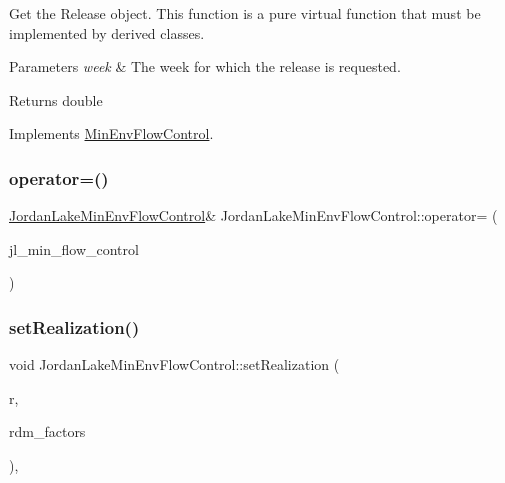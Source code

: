 Get the Release object. This function is a pure virtual function that must be implemented by derived classes. 


\begin{DoxyParams}{Parameters}
{\em week} & The week for which the release is requested.\\
\hline
\end{DoxyParams}
\begin{DoxyReturn}{Returns}
double 
\end{DoxyReturn}


Implements \mbox{\hyperlink{classMinEnvFlowControl_a5de79615852eb0c937dd559a9eb9402d}{Min\+Env\+Flow\+Control}}.

\mbox{\label{classJordanLakeMinEnvFlowControl_a1ac6bbacecf928296ff5f86ddbf0d973}} 
\subsubsection{\texorpdfstring{operator=()}{operator=()}}
{\footnotesize\ttfamily \mbox{\hyperlink{classJordanLakeMinEnvFlowControl}{Jordan\+Lake\+Min\+Env\+Flow\+Control}}\& Jordan\+Lake\+Min\+Env\+Flow\+Control\+::operator= (\begin{DoxyParamCaption}\item[{const \mbox{\hyperlink{classJordanLakeMinEnvFlowControl}{Jordan\+Lake\+Min\+Env\+Flow\+Control}} \&}]{jl\+\_\+min\+\_\+flow\+\_\+control }\end{DoxyParamCaption})}

\mbox{\label{classJordanLakeMinEnvFlowControl_aa1e816121060212f3dbeffda90a7baec}} 
\subsubsection{\texorpdfstring{set\+Realization()}{setRealization()}}
{\footnotesize\ttfamily void Jordan\+Lake\+Min\+Env\+Flow\+Control\+::set\+Realization (\begin{DoxyParamCaption}\item[{unsigned long}]{r,  }\item[{vector$<$ double $>$ \&}]{rdm\+\_\+factors }\end{DoxyParamCaption})\hspace{0.3cm}{\ttfamily [override]}, {\ttfamily [virtual]}}



